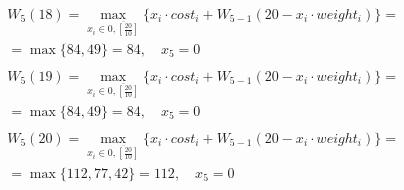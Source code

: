 \documentclass[17pt]{extarticle}
\begin{document}
\[
    \begin{aligned}
         & W_5(18)=\max_{x_i \in \overline{0, \left[\frac{20}{10}\right]}} \{x_i \cdot cost_i + W_{5-1}(20 - x_i \cdot weight_i)\}= \\& = \max \{
        84, 49\}= 84, \quad x_5 = 0                                                                                                 \\
    \end{aligned}
\]
\[
    \begin{aligned}
         & W_5(19)=\max_{x_i \in \overline{0, \left[\frac{20}{10}\right]}} \{x_i \cdot cost_i + W_{5-1}(20 - x_i \cdot weight_i)\}= \\& = \max \{
        84, 49\}= 84, \quad x_5 = 0                                                                                                 \\
    \end{aligned}
\]
\[
    \begin{aligned}
         & W_5(20)=\max_{x_i \in \overline{0, \left[\frac{20}{10}\right]}} \{x_i \cdot cost_i + W_{5-1}(20 - x_i \cdot weight_i)\}= \\& = \max \{
        112, 77, 42\}= 112, \quad x_5 = 0                                                                                           \\
    \end{aligned}
\]
\end{document}
